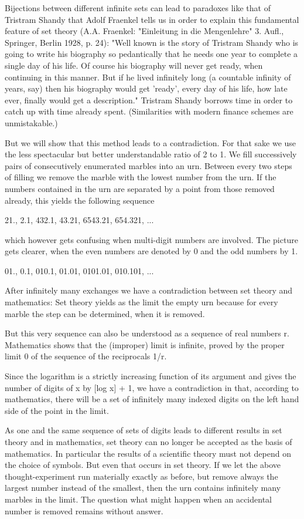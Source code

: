 \documentclass[12pt]{article}
\begin{document}
Bijections between different infinite sets can lead to paradoxes like that of Tristram Shandy that Adolf Fraenkel tells us in order to explain this fundamental feature of set theory (A.A. Fraenkel: "Einleitung in die Mengenlehre" 3. Aufl., Springer, Berlin 1928, p. 24): "Well known is the story of Tristram Shandy who is going to write his biography so pedantically that he needs one year to complete a single day of his life. Of course his biography will never get ready, when continuing in this manner. But if he lived infinitely long (a countable infinity of years, say) then his biography would get 'ready', every day of his life, how late ever, finally would get a description." Tristram Shandy borrows time in order to catch up with time already spent. (Similarities with modern finance schemes are unmistakable.)

But we will show that this method leads to a contradiction. For that sake we use the less spectacular but better understandable ratio of 2 to 1. We fill successively pairs of consecutively enumerated marbles into an urn. Between every two steps of filling we remove the marble with the lowest number from the urn. If the numbers contained in the urn are separated by a point from those removed already, this yields the following sequence

21., 2.1, 432.1, 43.21, 6543.21, 654.321, ...

which however gets confusing when multi-digit numbers are involved. The picture gets clearer, when the even numbers are denoted by 0 and the odd numbers by 1.

01., 0.1, 010.1, 01.01, 0101.01, 010.101, ...

After infinitely many exchanges we have a contradiction between set theory and mathematics: Set theory yields as the limit the empty urn because for every marble the step can be determined, when it is removed.

But this very sequence can also be understood as a sequence of real numbers r. Mathematics shows that the (improper) limit is infinite, proved by the proper limit 0 of the sequence of the reciprocals 1/r.

Since the logarithm is a strictly increasing function of its argument and gives the number of digits of x by [log x] + 1, we have a contradiction in that, according to mathematics, there will be a set of infinitely many indexed digits on the left hand side of the point in the limit.

As one and the same sequence of sets of digits leads to different results in set theory and in mathematics, set theory can no longer be accepted as the basis of mathematics.  In particular the results of a scientific theory must not depend on the choice of symbols. But even that occurs in set theory. If we let the above thought-experiment run materially exactly as before, but remove always the largest number instead of the smallest, then the urn contains infinitely many marbles in the limit. The question what might happen when an accidental number is removed remains without answer.
\end{document}
